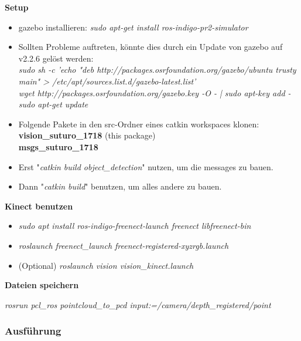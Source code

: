 \documentclass{suturo}
\begin{document}
\textbf{Setup}

\begin{itemize}
\item gazebo installieren: \textit{sudo apt-get install ros-indigo-pr2-simulator}

\item Sollten Probleme auftreten, könnte dies durch ein Update von gazebo auf v2.2.6 gelöst werden:
\\
\textit{sudo sh -c 'echo "deb http://packages.osrfoundation.org/gazebo/ubuntu trusty main" > /etc/apt/sources.list.d/gazebo-latest.list'}
\\
\textit{wget http://packages.osrfoundation.org/gazebo.key -O - | sudo apt-key add -}
\\
\textit{sudo apt-get update}

\item Folgende Pakete in den src-Ordner eines catkin workspaces klonen:\\
        \textbf{vision\_suturo\_1718} (this package) \\
        \textbf{msgs\_suturo\_1718}
\item Erst "\textit{catkin build object\_detection}" nutzen, um die messages zu bauen.
\item Dann "\textit{catkin build}" benutzen, um alles andere zu bauen.

\end{itemize}

\textbf{Kinect benutzen}
\begin{itemize}
\item \textit{sudo apt install ros-indigo-freenect-launch freenect libfreenect-bin}
\item \textit{roslaunch freenect\_launch freenect-registered-xyzrgb.launch}
\item (Optional) \textit{roslaunch vision vision\_kinect.launch}
\end{itemize}

\textbf{Dateien speichern}

    \textit{rosrun pcl\_ros pointcloud\_to\_pcd input:=/camera/depth\_registered/point}


\subsubsection{Ausf\"uhrung}
\end{document}

